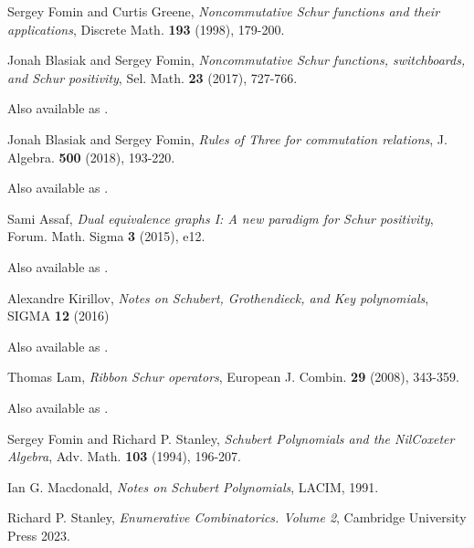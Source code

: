 \documentclass{article}
\begin{document}
\begin{thebibliography}{999999}
    \raggedright\footnotesize

    Sergey Fomin and Curtis Greene, 
    \textit{Noncommutative Schur functions and their applications}, 
    Discrete Math. \textbf{193} (1998), 179-200.

    Jonah Blasiak and Sergey Fomin, 
    \textit{Noncommutative Schur functions, switchboards, and Schur positivity},
    Sel. Math. \textbf{23} (2017), 727-766.

    Also available as .

    Jonah Blasiak and Sergey Fomin, 
    \textit{Rules of Three for commutation relations},
    J. Algebra. \textbf{500} (2018), 193-220.

    Also available as .

    Sami Assaf,
    \textit{Dual equivalence graphs I: A new paradigm for Schur positivity},
    Forum. Math. Sigma \textbf{3} (2015), e12.

    Also available as .

    Alexandre Kirillov,
    \textit{Notes on Schubert, Grothendieck, and Key polynomials},
    SIGMA \textbf{12} (2016)

    Also available as .

    Thomas Lam,
    \textit{Ribbon Schur operators},
    European J. Combin. \textbf{29} (2008), 343-359.

    Also available as .

    Sergey Fomin and Richard P. Stanley, 
    \textit{Schubert Polynomials and the NilCoxeter Algebra},
    Adv. Math. \textbf{103} (1994), 196-207.

    Ian G. Macdonald, 
    \textit{Notes on Schubert Polynomials}, 
    LACIM, 1991.

    Richard P. Stanley, 
    \textit{Enumerative Combinatorics. Volume 2}, 
    Cambridge University Press 2023.

\end{thebibliography}
\end{document}
